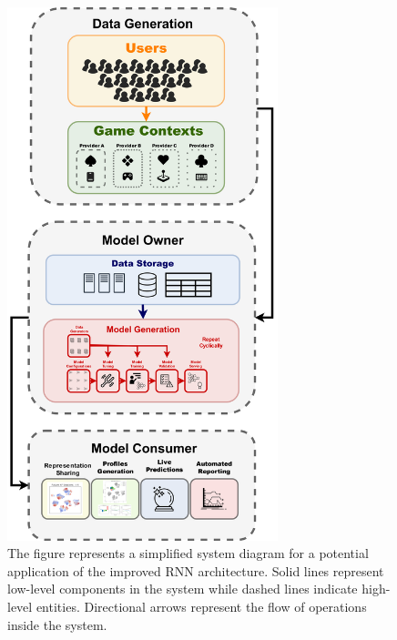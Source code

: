\begin{figure}[ht]
\centering
\includegraphics[width=0.7\textwidth]{images/chapter_5/pipeline_diagram.png}
\caption[\textbf{Model Deployment Pipeline}]{The figure represents a simplified system diagram for a potential application of the improved RNN architecture. Solid lines represent low-level components in the system while dashed lines indicate high-level entities. Directional arrows represent the flow of operations inside the system.}
\label{pipeline}
\end{figure}